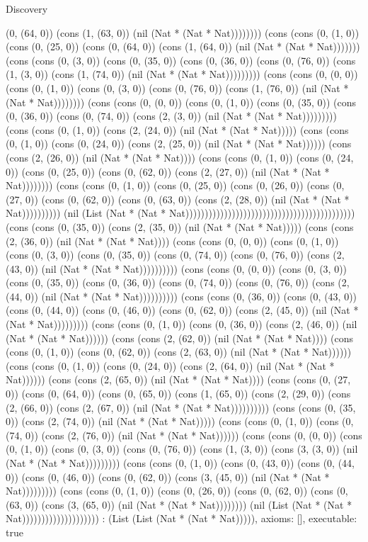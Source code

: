 \begin{lexlean}{Discovery}
\begin{semanticmodule}
{(0, (64, 0)) (cons (1, (63, 0)) (nil (Nat * (Nat * Nat)))))))) (cons (cons (0, (1, 0)) (cons (0, (25, 0)) (cons (0, (64, 0)) (cons (1, (64, 0)) (nil (Nat * (Nat * Nat))))))) (cons (cons (0, (3, 0)) (cons (0, (35, 0)) (cons (0, (36, 0)) (cons (0, (76, 0)) (cons (1, (3, 0)) (cons (1, (74, 0)) (nil (Nat * (Nat * Nat))))))))) (cons (cons (0, (0, 0)) (cons (0, (1, 0)) (cons (0, (3, 0)) (cons (0, (76, 0)) (cons (1, (76, 0)) (nil (Nat * (Nat * Nat)))))))) (cons (cons (0, (0, 0)) (cons (0, (1, 0)) (cons (0, (35, 0)) (cons (0, (36, 0)) (cons (0, (74, 0)) (cons (2, (3, 0)) (nil (Nat * (Nat * Nat))))))))) (cons (cons (0, (1, 0)) (cons (2, (24, 0)) (nil (Nat * (Nat * Nat))))) (cons (cons (0, (1, 0)) (cons (0, (24, 0)) (cons (2, (25, 0)) (nil (Nat * (Nat * Nat)))))) (cons (cons (2, (26, 0)) (nil (Nat * (Nat * Nat)))) (cons (cons (0, (1, 0)) (cons (0, (24, 0)) (cons (0, (25, 0)) (cons (0, (62, 0)) (cons (2, (27, 0)) (nil (Nat * (Nat * Nat)))))))) (cons (cons (0, (1, 0)) (cons (0, (25, 0)) (cons (0, (26, 0)) (cons (0, (27, 0)) (cons (0, (62, 0)) (cons (0, (63, 0)) (cons (2, (28, 0)) (nil (Nat * (Nat * Nat)))))))))) (nil (List (Nat * (Nat * Nat)))))))))))))))))))))))))))))))))))))))))))) (cons (cons (0, (35, 0)) (cons (2, (35, 0)) (nil (Nat * (Nat * Nat))))) (cons (cons (2, (36, 0)) (nil (Nat * (Nat * Nat)))) (cons (cons (0, (0, 0)) (cons (0, (1, 0)) (cons (0, (3, 0)) (cons (0, (35, 0)) (cons (0, (74, 0)) (cons (0, (76, 0)) (cons (2, (43, 0)) (nil (Nat * (Nat * Nat)))))))))) (cons (cons (0, (0, 0)) (cons (0, (3, 0)) (cons (0, (35, 0)) (cons (0, (36, 0)) (cons (0, (74, 0)) (cons (0, (76, 0)) (cons (2, (44, 0)) (nil (Nat * (Nat * Nat)))))))))) (cons (cons (0, (36, 0)) (cons (0, (43, 0)) (cons (0, (44, 0)) (cons (0, (46, 0)) (cons (0, (62, 0)) (cons (2, (45, 0)) (nil (Nat * (Nat * Nat))))))))) (cons (cons (0, (1, 0)) (cons (0, (36, 0)) (cons (2, (46, 0)) (nil (Nat * (Nat * Nat)))))) (cons (cons (2, (62, 0)) (nil (Nat * (Nat * Nat)))) (cons (cons (0, (1, 0)) (cons (0, (62, 0)) (cons (2, (63, 0)) (nil (Nat * (Nat * Nat)))))) (cons (cons (0, (1, 0)) (cons (0, (24, 0)) (cons (2, (64, 0)) (nil (Nat * (Nat * Nat)))))) (cons (cons (2, (65, 0)) (nil (Nat * (Nat * Nat)))) (cons (cons (0, (27, 0)) (cons (0, (64, 0)) (cons (0, (65, 0)) (cons (1, (65, 0)) (cons (2, (29, 0)) (cons (2, (66, 0)) (cons (2, (67, 0)) (nil (Nat * (Nat * Nat)))))))))) (cons (cons (0, (35, 0)) (cons (2, (74, 0)) (nil (Nat * (Nat * Nat))))) (cons (cons (0, (1, 0)) (cons (0, (74, 0)) (cons (2, (76, 0)) (nil (Nat * (Nat * Nat)))))) (cons (cons (0, (0, 0)) (cons (0, (1, 0)) (cons (0, (3, 0)) (cons (0, (76, 0)) (cons (1, (3, 0)) (cons (3, (3, 0)) (nil (Nat * (Nat * Nat))))))))) (cons (cons (0, (1, 0)) (cons (0, (43, 0)) (cons (0, (44, 0)) (cons (0, (46, 0)) (cons (0, (62, 0)) (cons (3, (45, 0)) (nil (Nat * (Nat * Nat))))))))) (cons (cons (0, (1, 0)) (cons (0, (26, 0)) (cons (0, (62, 0)) (cons (0, (63, 0)) (cons (3, (65, 0)) (nil (Nat * (Nat * Nat)))))))) (nil (List (Nat * (Nat * Nat)))))))))))))))))))) : (List (List (Nat * (Nat * Nat))))),
  axioms: [],
  executable: true
}


\end{semanticmodule}
\end{lexlean}
